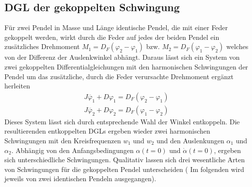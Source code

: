 \subsection{DGL der gekoppelten Schwingung}
Für zwei Pendel in Masse und Länge identische Pendel, die mit einer Feder gekoppelt werden, wirkt durch die Feder auf jedes der beiden Pendel ein zusätzliches Drehmoment $M_1=D_F(\varphi_2-\varphi_1)$ bzw. $M_2=D_F(\varphi_1-\varphi_2)$
welches von der Differenz der Auslenkwinkel abhängt. Daraus lässt sich ein System von zwei gekoppelten Differentialgleichungen mit den harmonischen Schwingungen der Pendel um das zusätzliche, durch die Feder verursachte Drehmoment ergänzt herleiten
\begin{gather}
J\ddot{\varphi_1}+D\varphi_1=D_F(\varphi_2-\varphi_1) \\
J\ddot{\varphi_2}+D\varphi_2=D_F(\varphi_1-\varphi_2)
\end{gather} 
Dieses System lässt sich durch entsprechende Wahl der Winkel entkoppeln. Die resultierenden entkoppelten DGLs ergeben wieder zwei harmonischen Schwingungen mit den Kreisfrequenzen $w_1$ und $w_2$ und den Auslenkungen $\alpha_1$ und $\alpha_2$. \newline
Abhängig von den Anfangsbedingungen $\alpha(t=0)$ und $\dot{\alpha}(t=0)$, ergeben sich unterschiedliche Schwingungen. Qualitativ lassen sich drei wesentliche Arten von Schwingungen für die gekoppelten Pendel unterscheiden ( Im folgenden wird jeweils von zwei identischen Pendeln ausgegangen).
